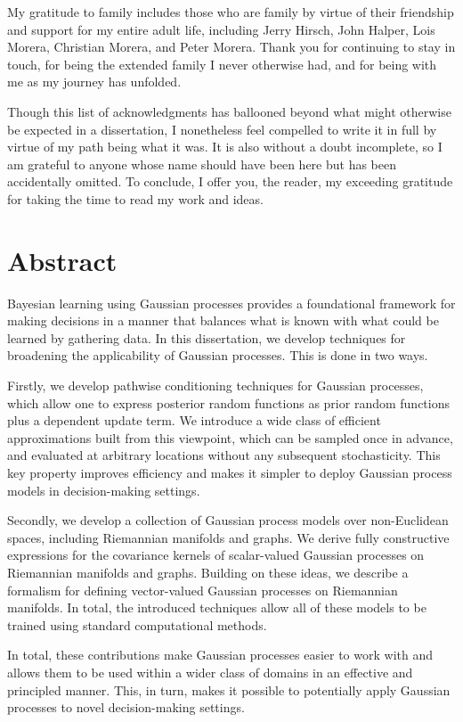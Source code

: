 \documentclass[11pt]{book}
\begin{document}
My gratitude to family includes those who are family by virtue of their friendship and support for my entire adult life, including Jerry Hirsch, John Halper, Lois Morera, Christian Morera, and Peter Morera.
Thank you for continuing to stay in touch, for being the extended family I never otherwise had, and for being with me as my journey has unfolded.

Though this list of acknowledgments has ballooned beyond what might otherwise be expected in a dissertation, I nonetheless feel compelled to write it in full by virtue of my path being what it was.
It is also without a doubt incomplete, so I am grateful to anyone whose name should have been here but has been accidentally omitted.
To conclude, I offer you, the reader, my exceeding gratitude for taking the time to read my work and ideas.

\chapter*{Abstract}

Bayesian learning using Gaussian processes provides a foundational framework for making decisions in a manner that balances what is known with what could be learned by gathering data. 
In this dissertation, we develop techniques for broadening the applicability of Gaussian processes.
This is done in two ways.

Firstly, we develop pathwise conditioning techniques for Gaussian processes, which allow one to express posterior random functions as prior random functions plus a dependent update term.
We introduce a wide class of efficient approximations built from this viewpoint, which can be sampled once in advance, and evaluated at arbitrary locations without any subsequent stochasticity.
This key property improves efficiency and makes it simpler to deploy Gaussian process models in decision-making settings.

Secondly, we develop a collection of Gaussian process models over non-Euclidean spaces, including Riemannian manifolds and graphs.
We derive fully constructive expressions for the covariance kernels of scalar-valued Gaussian processes on Riemannian manifolds and graphs.
Building on these ideas, we describe a formalism for defining vector-valued Gaussian processes on Riemannian manifolds. 
In total, the introduced techniques allow all of these models to be trained using standard computational methods.

In total, these contributions make Gaussian processes easier to work with and allows them to be used within a wider class of domains in an effective and principled manner.
This, in turn, makes it possible to potentially apply Gaussian processes to novel decision-making settings.
\end{document}
